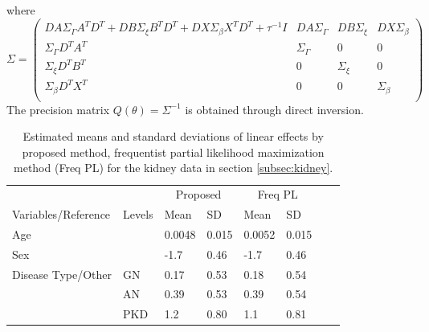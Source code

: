 \documentclass[ba]{imsart}
\begin{document}
where
\begin{equation*}
\Sigma = \begin{pmatrix}
DA\Sigma_{\Gamma}A^{T}D^{T} + DB\Sigma_{\xi}B^{T}D^{T} + DX\Sigma_{\beta}X^{T}D^{T} + \tau^{-1}I & DA\Sigma_{\Gamma} & DB\Sigma_{\xi} & DX\Sigma_{\beta} \\
\Sigma_{\Gamma}D^{T}A^{T} & \Sigma_{\Gamma} & 0 & 0 \\
\Sigma_{\xi}D^{T}B^{T} & 0 & \Sigma_{\xi} & 0 \\
\Sigma_{\beta}D^{T}X^{T} & 0 & 0 & \Sigma_{\beta} \\
\end{pmatrix}
\end{equation*}
The precision matrix $Q(\theta) = \Sigma^{-1}$ is obtained through direct inversion.


\nocite{*}%

%




\begin{table}
\begin{tabular}
{|p{3cm}|
p{1cm}|p{1cm}p{1cm}|p{1cm}p{1cm}|p{1cm}p{1cm}|}
\cline{1-8}
      \multicolumn{1}{l}{} &
      \multicolumn{1}{l}{} &
      \multicolumn{2}{c}{Proposed} &
      \multicolumn{2}{c}{Freq PL}\\
      Variables/Reference & Levels & {Mean} & {SD} & {Mean} & {SD} \\
 \hline
 Age & & 0.0048&0.015 & 0.0052&0.015\\
 Sex & & -1.7&0.46  & -1.7&0.46\\
 Disease Type/Other & GN & 0.17&0.53 &  0.18&0.54\\
  & AN & 0.39&0.53 & 0.39&0.54\\
  & PKD & 1.2&0.80  & 1.1&0.81\\
\hline
\end{tabular}
\caption{Estimated means and standard deviations of linear effects by proposed method, frequentist partial likelihood maximization method (Freq PL) for the kidney data in section \ref{subsec:kidney}.}
\label{table:KidneyFixed}
\end{table}
\end{document}
